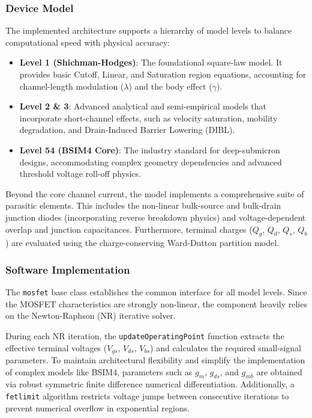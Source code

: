 \subsubsection{Device Model}
The implemented architecture supports a hierarchy of model levels to balance computational speed with physical accuracy:
\begin{itemize}
    \item \textbf{Level 1 (Shichman-Hodges)}: The foundational square-law model. It provides basic Cutoff, Linear, and Saturation region equations, accounting for channel-length modulation ($\lambda$) and the body effect ($\gamma$).
    \item \textbf{Level 2 \& 3}: Advanced analytical and semi-empirical models that incorporate short-channel effects, such as velocity saturation, mobility degradation, and Drain-Induced Barrier Lowering (DIBL).
    \item \textbf{Level 54 (BSIM4 Core)}: The industry standard for deep-submicron designs, accommodating complex geometry dependencies and advanced threshold voltage roll-off physics.
\end{itemize}

Beyond the core channel current, the model implements a comprehensive suite of parasitic elements. This includes the non-linear bulk-source and bulk-drain junction diodes (incorporating reverse breakdown physics) and voltage-dependent overlap and junction capacitances. Furthermore, terminal charges ($Q_g$, $Q_d$, $Q_s$, $Q_b$) are evaluated using the charge-conserving Ward-Dutton partition model.

\subsubsection{Software Implementation}
The \texttt{mosfet} base class establishes the common interface for all model levels. Since the MOSFET characteristics are strongly non-linear, the component heavily relies on the Newton-Raphson (NR) iterative solver. 

During each NR iteration, the \texttt{updateOperatingPoint} function extracts the effective terminal voltages ($V_{gs}$, $V_{ds}$, $V_{bs}$) and calculates the required small-signal parameters. To maintain architectural flexibility and simplify the implementation of complex models like BSIM4, parameters such as $g_m$, $g_{ds}$, and $g_{mb}$ are obtained via robust symmetric finite difference numerical differentiation. Additionally, a \texttt{fetlimit} algorithm restricts voltage jumps between consecutive iterations to prevent numerical overflow in exponential regions.

